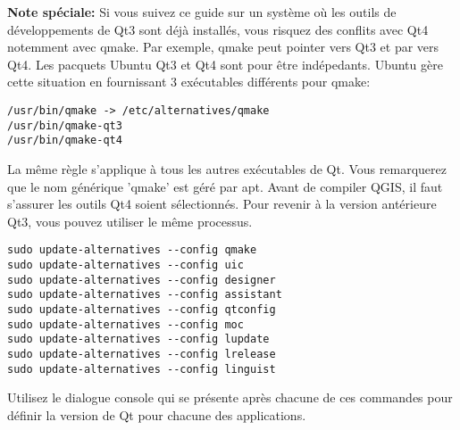 \textbf{Note spéciale:} Si vous suivez ce guide sur un système où les outils de développements de Qt3 sont déjà installés, vous risquez des conflits avec Qt4 notemment avec qmake. Par exemple, qmake peut pointer vers Qt3 et par vers Qt4. Les pacquets Ubuntu Qt3 et Qt4 sont pour être indépedants. Ubuntu gère cette situation en fournissant 3 exécutables différents pour qmake:

\begin{verbatim}
/usr/bin/qmake -> /etc/alternatives/qmake 
/usr/bin/qmake-qt3
/usr/bin/qmake-qt4 
\end{verbatim}

La même règle s'applique à tous les autres exécutables de Qt. Vous remarquerez que le nom générique 'qmake' est géré par apt. Avant de compiler QGIS, il faut s'assurer les outils Qt4 soient sélectionnés. Pour revenir à la version antérieure Qt3, vous pouvez utiliser le même processus.

\begin{verbatim}
sudo update-alternatives --config qmake
sudo update-alternatives --config uic 
sudo update-alternatives --config designer 
sudo update-alternatives --config assistant 
sudo update-alternatives --config qtconfig 
sudo update-alternatives --config moc 
sudo update-alternatives --config lupdate 
sudo update-alternatives --config lrelease 
sudo update-alternatives --config linguist 
\end{verbatim}

Utilisez le dialogue console qui se présente après chacune de ces commandes pour définir la version de Qt pour chacune des applications.

% 
% 
% 
% 

